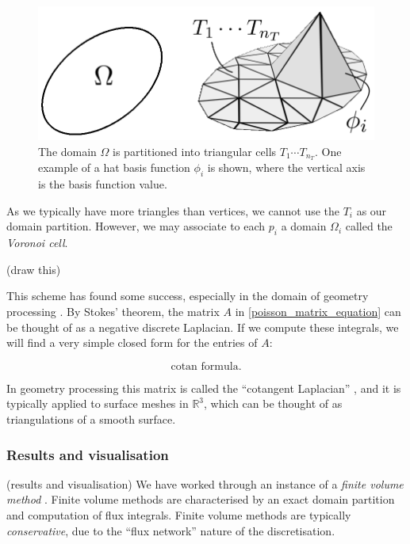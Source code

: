 \begin{figure}[H]
    \begin{center}
        \includegraphics[width=0.53\linewidth]{figures/hat.png}
    \end{center}
    \caption{\scriptsize
        The domain $\Omega$ is partitioned into triangular cells $T_1\cdots T_{n_T}$. One example of a hat basis function $\phi_i$ is shown, where
        the vertical axis is the basis function value.
    }
    \label{ellipse_partition}
\end{figure}



As we typically have more triangles than vertices, we cannot use the $T_i$ as our domain partition. However, we may
associate to each $p_i$ a domain $\Omega_i$ called the \textit{Voronoi cell}.

\vskip 0.2in
(draw this)
\vskip 0.2in

This scheme has found some success, especially in the domain of geometry processing \cite{polygon_mesh_processing}.
By Stokes' theorem, the matrix $A$ in \eqref{poisson_matrix_equation} can be thought of as a negative discrete Laplacian.
If we compute these integrals, we will find a very simple closed form for the entries of $A$:

$$\text{cotan formula.}$$

In geometry processing this matrix is called the ``cotangent Laplacian'' \cite{polygon_mesh_processing}, and it is typically
applied to surface meshes in $\mathbb{R}^3$, which can be thought of as triangulations of a smooth surface.

\subsubsection{Results and visualisation}
\vskip 0.2in
(results and visualisation)
\vskip 0.2in
We have worked through an instance of a \textit{finite volume method} \cite{pde_larsson}.
Finite volume methods are characterised by an exact domain partition and computation of flux integrals.
Finite volume methods are typically \textit{conservative}, due to the ``flux network'' nature of the discretisation.
